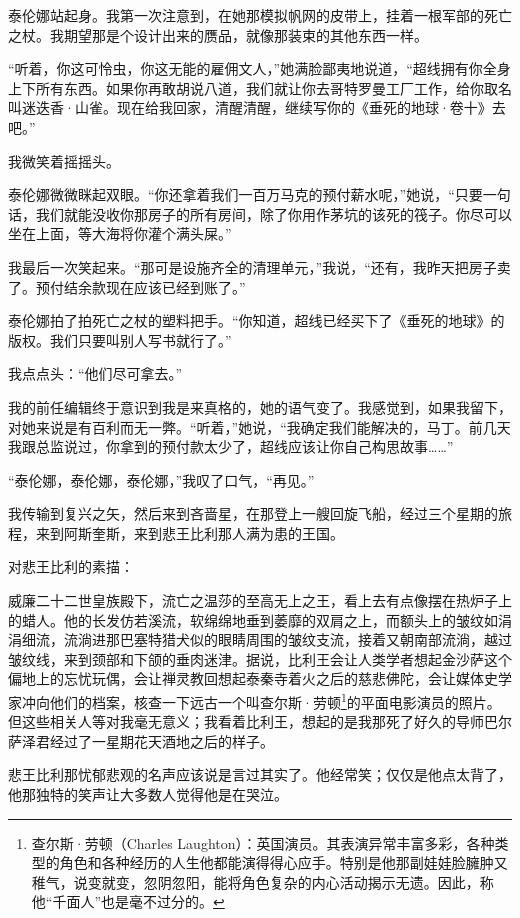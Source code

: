\documentclass[AutoFakeBold=true]{book}
\begin{document}
泰伦娜站起身。我第一次注意到，在她那模拟帆网的皮带上，挂着一根军部的死亡之杖。我期望那是个设计出来的赝品，就像那装束的其他东西一样。

``听着，你这可怜虫，你这无能的雇佣文人，''她满脸鄙夷地说道，``超线拥有你全身上下所有东西。如果你再敢胡说八道，我们就让你去哥特罗曼工厂工作，给你取名叫迷迭香·山雀。现在给我回家，清醒清醒，继续写你的《垂死的地球·卷十》去吧。''

我微笑着摇摇头。

泰伦娜微微眯起双眼。``你还拿着我们一百万马克的预付薪水呢，''她说，``只要一句话，我们就能没收你那房子的所有房间，除了你用作茅坑的该死的筏子。你尽可以坐在上面，等大海将你灌个满头屎。''

我最后一次笑起来。``那可是设施齐全的清理单元，''我说，``还有，我昨天把房子卖了。预付结余款现在应该已经到账了。''

泰伦娜拍了拍死亡之杖的塑料把手。``你知道，超线已经买下了《垂死的地球》的版权。我们只要叫别人写书就行了。''

我点点头：``他们尽可拿去。''

我的前任编辑终于意识到我是来真格的，她的语气变了。我感觉到，如果我留下，对她来说是有百利而无一弊。``听着，''她说，``我确定我们能解决的，马丁。前几天我跟总监说过，你拿到的预付款太少了，超线应该让你自己构思故事……''

``泰伦娜，泰伦娜，泰伦娜，''我叹了口气，``再见。''

我传输到复兴之矢，然后来到吝啬星，在那登上一艘回旋飞船，经过三个星期的旅程，来到阿斯奎斯，来到悲王比利那人满为患的王国。

\vspace*{1em}

对悲王比利的素描：

威廉二十二世皇族殿下，流亡之温莎的至高无上之王，看上去有点像摆在热炉子上的蜡人。他的长发仿若溪流，软绵绵地垂到萎靡的双肩之上，而额头上的皱纹如涓涓细流，流淌进那巴塞特猎犬似的眼睛周围的皱纹支流，接着又朝南部流淌，越过皱纹线，来到颈部和下颌的垂肉迷津。据说，比利王会让人类学者想起金沙萨这个偏地上的忘忧玩偶，会让禅灵教回想起泰秦寺着火之后的慈悲佛陀，会让媒体史学家冲向他们的档案，核查一下远古一个叫查尔斯·劳顿\footnote{查尔斯·劳顿（Charles Laughton）：英国演员。其表演异常丰富多彩，各种类型的角色和各种经历的人生他都能演得得心应手。特别是他那副娃娃脸臃肿又稚气，说变就变，忽阴忽阳，能将角色复杂的内心活动揭示无遗。因此，称他``千面人''也是毫不过分的。}的平面电影演员的照片。但这些相关人等对我毫无意义；我看着比利王，想起的是我那死了好久的导师巴尔萨泽君经过了一星期花天酒地之后的样子。

悲王比利那忧郁悲观的名声应该说是言过其实了。他经常笑；仅仅是他点太背了，他那独特的笑声让大多数人觉得他是在哭泣。
\end{document}
